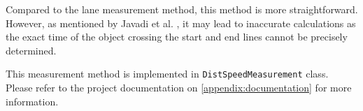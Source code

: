 Compared to the lane measurement method, this method is more straightforward. However, as mentioned by Javadi et al. \cite{Javadi2019}, it may lead to inaccurate calculations as the exact time of the object crossing the start and end lines cannot be precisely determined.

This measurement method is implemented in \texttt{DistSpeedMeasurement} class. Please refer to the project documentation on \ref{appendix:documentation} for more information.
















